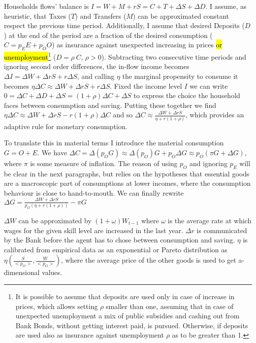 \documentclass[a4paper, headings=standardclasses]{scrartcl}
\begin{document}
Households flows' balance is $I = W + M + rS = C + T + \Delta S + \Delta D$.
I assume, as heuristic, that Taxes ($T$) and Transfers ($M$) can be approximated constant respect the previous time period.
Additionally, I assume that desired Deposits ($D$) at the end of the period are a fraction of the desired consumption ($C = p_E E + p_O O$) as insurance against unexpected increasing in prices \hl{or unemployment}\footnote{It is possible to assume that deposits are used only in case of increase in prices, which allows setting $\rho$ smaller than one, assuming that in case of unexpected unemployment a mix of public subsidies and cashing out from Bank Bonds, without getting interest paid, is pursued. Otherwise, if deposits are used also as insurance against unemployment $\rho$ as to be greater than 1.} ($D = \rho~C$, $\rho > 0$).
Subtracting two consecutive time periods and ignoring second order differences, the in-flow income becomes $\Delta I = \Delta W + \Delta r S + r \Delta S$, and calling $\eta$ the marginal propensity to consume it becomes $\eta \Delta C \approx \Delta W + \Delta r S + r \Delta S$.
Fixed the income level $I$ we can write $0 = \Delta C + \Delta D + \Delta S = (1+\rho) \Delta C + \Delta S$ to express the choice the household faces between consumption and saving.
Putting these together we find $\eta \Delta C \approx \Delta W + \Delta r S - r (1+\rho) \Delta C$ and so $\Delta C \approx \frac{\Delta W + \Delta r S}{\eta + r (1+\rho)}$, which provides an adaptive rule for monetary consumption.

To translate this in material terms I introduce the material consumption $G = O + E$. We have $\Delta C = \Delta (p_O G) \approx \Delta(p_O) G + p_O \Delta G \approx p_O (\pi G + \Delta G)$, where $\pi$ is some measure of inflation. The reason of using $p_O$ and ignoring $p_E$ will be clear in the next paragraphs, but relies on the hypotheses that essential goods are a macroscopic part of consumptions at lower incomes, where the consumption behaviour is close to hand-to-mouth. We can finally rewrite $\Delta G = \frac{\Delta W + \Delta r S}{p_O(\eta + r (1+\rho))} - \pi G$

$\Delta W$ can be approximated by $(1 + \omega) W_{t-1}$ where $\omega$ is the average rate at which wages for the given skill level are increased in the last year. $\Delta r$ is communicated by the Bank before the agent has to chose between consumption and saving. $\eta$ is calibrated from empirical data as an exponential or Pareto distribution as $\eta(\frac{S}{<p_O>},\frac{W}{<p_O>})$, where the average price of the other goods is used to get a-dimensional values.
\end{document}
